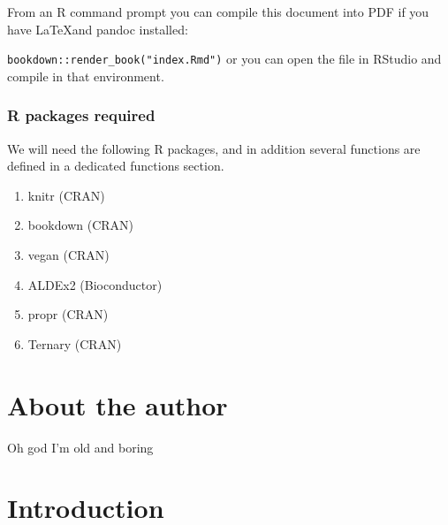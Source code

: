 \documentclass[
  onecolumn]{article}
\providecommand{\tightlist}{%
  \setlength{\itemsep}{0pt}\setlength{\parskip}{0pt}}
\begin{document}
From an R command prompt you can compile this document into PDF if you have \LaTeX and pandoc installed:

\texttt{bookdown::render\_book("index.Rmd")} or you can open the file in RStudio and compile in that environment.

\hypertarget{r-packages-required}{%
\subsubsection{R packages required}\label{r-packages-required}}

We will need the following R packages, and in addition several functions are defined in a dedicated functions section.

\begin{enumerate}
\def\labelenumi{\arabic{enumi}.}
\tightlist
\item
  knitr (CRAN)
\item
  bookdown (CRAN)
\item
  vegan (CRAN)
\item
  ALDEx2 (Bioconductor)
\item
  propr (CRAN)
\item
  Ternary (CRAN)
\end{enumerate}

\hypertarget{about-the-author}{%
\section*{About the author}\label{about-the-author}}

Oh god I'm old and boring

\clearpage

\hypertarget{intro}{%
\section{Introduction}\label{intro}}
\end{document}
